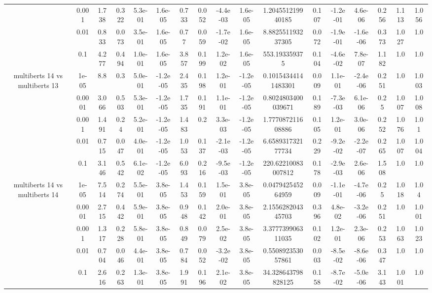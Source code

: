\begin{tabular}{|c|c|c|c|c|c|c|c|c|c|c|c|c|c|c|c|c|}
 & 0.001 & 1.738 & 0.322 & 5.3e-01 & 1.6e-05 & 0.733 & 0.052 & -4.4e-03 & 1.6e-05 & 1.204551219940185 & 0.107 & -1.2e-01 & 4.6e-06 & 0.256 & 1.113 & 1.056 \\
 & 0.01 & 0.833 & 0.073 & 3.5e-01 & 1.6e-05 & 0.77 & 0.059 & -1.7e-02 & 1.6e-05 & 8.882551193237305 & 0.072 & -1.9e-01 & -1.6e-06 & 0.373 & 1.027 & 1.0 \\
 & 0.1 & 4.277 & 0.494 & 1.0e-01 & 1.6e-05 & 3.857 & 0.199 & 1.2e-02 & 1.6e-05 & 553.193359375 & 0.104 & -4.6e-02 & 7.8e-07 & 1.182 & 1.0 & 1.0 \\
\hline
\multirow{5}{*}{multiberts 14 vs multiberts 13} & 1e-05 & 8.8 & 0.3 & 5.0e-01 & -1.2e-05 & 2.435 & 0.198 & 1.2e-01 & -1.2e-05 & 0.10154344141483301 & 0.009 & 1.1e-01 & -2.4e-06 & 0.251 & 1.0 & 1.003 \\
 & 0.0001 & 3.066 & 0.503 & 5.3e-01 & -1.2e-05 & 1.735 & 0.191 & 1.1e-01 & -1.2e-05 & 0.8024803400039671 & 0.189 & -7.3e-03 & 6.1e-06 & 0.25 & 1.007 & 1.008 \\
 & 0.001 & 1.491 & 0.24 & 5.2e-01 & -1.2e-05 & 1.483 & 0.2 & 3.3e-03 & -1.2e-05 & 1.777087211608886 & 0.105 & 1.2e-01 & 3.0e-06 & 0.252 & 1.076 & 1.01 \\
 & 0.01 & 0.715 & 0.047 & 4.0e-01 & -1.2e-05 & 1.053 & 0.137 & -2.1e-03 & -1.2e-05 & 6.658931732177734 & 0.229 & -9.2e-02 & -2.2e-07 & 0.265 & 1.007 & 1.004 \\
 & 0.1 & 3.146 & 0.542 & 6.1e-02 & -1.2e-05 & 6.093 & 0.216 & -9.5e-03 & -1.2e-05 & 220.62210083007812 & 0.178 & -2.9e-03 & 2.6e-06 & 1.508 & 1.0 & 1.0 \\
\hline
\multirow{5}{*}{multiberts 14 vs multiberts 14} & 1e-05 & 7.514 & 0.274 & 5.5e-01 & 3.8e-05 & 1.453 & 0.159 & 1.5e-01 & 3.8e-05 & 0.047942545264959 & 0.009 & -1.1e-01 & -4.7e-06 & 0.25 & 1.018 & 1.04 \\
 & 0.0001 & 2.715 & 0.442 & 5.9e-01 & 3.8e-05 & 0.948 & 0.142 & 2.0e-01 & 3.8e-05 & 2.155628204345703 & 0.396 & 4.8e-02 & -3.2e-06 & 0.251 & 1.0 & 1.001 \\
 & 0.001 & 1.317 & 0.228 & 5.8e-01 & 3.8e-05 & 0.849 & 0.079 & 2.5e-02 & 3.8e-05 & 3.377739906311035 & 0.102 & 1.2e-01 & 2.3e-06 & 0.253 & 1.063 & 1.023 \\
 & 0.01 & 0.704 & 0.046 & 4.4e-01 & 3.8e-05 & 0.784 & 0.052 & -3.2e-02 & 3.8e-05 & 0.550892353057861 & 0.003 & -8.5e-02 & -8.6e-06 & 0.347 & 1.0 & 1.0 \\
 & 0.1 & 2.616 & 0.263 & 1.3e-01 & 3.8e-05 & 1.991 & 0.196 & 2.1e-02 & 3.8e-05 & 34.328643798828125 & 0.158 & -8.7e-02 & -5.0e-06 & 3.143 & 1.001 & 1.0 \\

\end{tabular}
